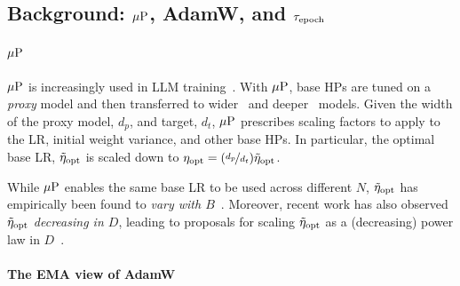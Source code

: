 


\subsection{Background: $\mbox{$\mu$P}$, AdamW, and $\tau_\text{epoch}$}

\paragraph{$\mbox{$\mu$P}$}\label{sec:mup}
%
$\mbox{$\mu$P}$ is increasingly used in LLM
training~\citep{dey2023cerebras,dey2023btlm3b8k,sengupta2023jais,shen2024power,hu2024minicpm,abdin2024phi}.
%
With $\mbox{$\mu$P}$, base HPs are tuned on a \emph{proxy} model and then
transferred to wider~\citep{yang2022mup} and
deeper~\citep{dey2025dont} models.
Given the width of the proxy model, $d_p$, and target, $d_t$, $\mbox{$\mu$P}$
prescribes scaling factors to apply to the LR, initial weight
variance, and other base HPs.
%
In particular, the optimal base LR, $\tilde{\eta}_{\text{opt}}$ is scaled down to
$\eta_{\text{opt}} = (\nicefrac{d_p}{d_t})\tilde{\eta}_{\text{opt}}$.
%
%

While $\mbox{$\mu$P}$ enables the same base LR to be used across different $N$,
$\tilde{\eta}_{\text{opt}}$ has empirically been found to \emph{vary with
$B$}~\citep{yang2022mup,lingle2024large,noci2024learning,shen2024power}.
%
Moreover, recent work has also observed $\tilde{\eta}_{\text{opt}}$ \emph{decreasing
in $D$}, leading to proposals for scaling $\tilde{\eta}_{\text{opt}}$ as a
(decreasing) power law in $D$~\citep{shen2024power,bjorck2024scaling}.
%

\paragraph{The EMA view of AdamW}\label{sec:ema}

